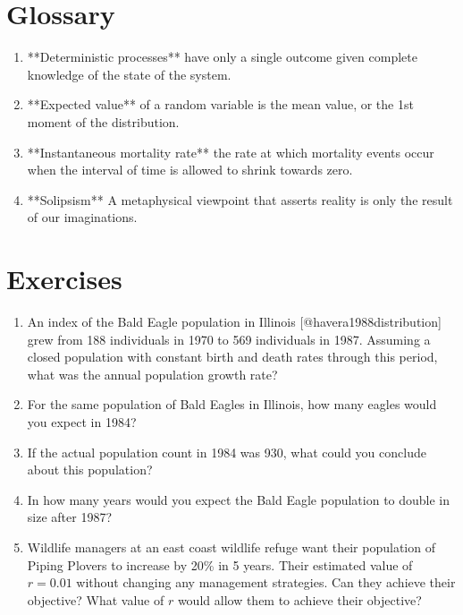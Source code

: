 \documentclass[]{book}
\begin{document}
\section{Glossary}\label{glossary}

\begin{enumerate}
  \item **Deterministic processes** have only a single outcome given complete knowledge of the state of the system.
  \item **Expected value** of a random variable is the mean value, or the 1st moment of the distribution.
  \item **Instantaneous mortality rate** the rate at which mortality events occur when the interval of time is allowed to shrink towards zero.
  \item **Solipsism** A metaphysical viewpoint that asserts reality is only the result of our imaginations.
\end{enumerate}

\section{Exercises}\label{exercises}

\begin{enumerate}
  \item An index of the Bald Eagle population in Illinois [@havera1988distribution] grew from 188 individuals in 1970 to 569 individuals in 1987. Assuming a closed population with constant birth and death rates through this period, what was the annual population growth rate?
  \item For the same population of Bald Eagles in Illinois, how many eagles would you expect in 1984?
  \item If the actual population count in 1984 was 930, what could you conclude about this population?
  \item In how many years would you expect the Bald Eagle population to double in size after 1987?
  \item Wildlife managers at an east coast wildlife refuge want their population of Piping Plovers to increase by 20\% in 5 years. Their estimated value of $r = 0.01$ without changing any management strategies. Can they achieve their objective? What value of $r$ would allow them to achieve their objective?
\end{enumerate}


\end{document}
